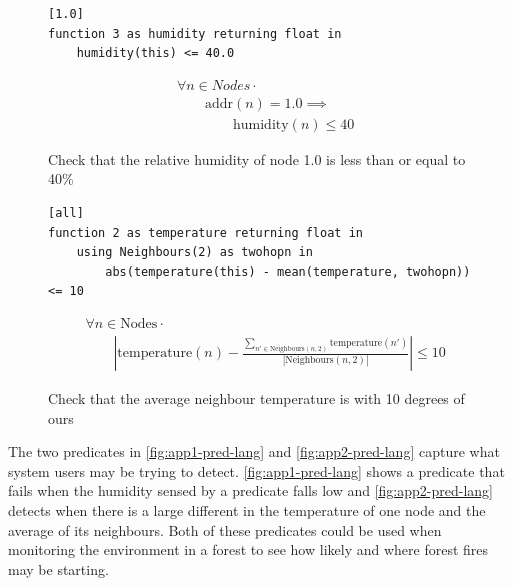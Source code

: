 \begin{figure}[H]
\begin{minipage}{.5\linewidth}
\begin{lstlisting}[language=Hoppy]
[1.0]
function 3 as humidity returning float in
    humidity(this) <= 40.0
\end{lstlisting}
\end{minipage}%
\begin{minipage}{.5\linewidth}
\begin{align*}
&				\forall n \in Nodes \cdot \\
& \hspace{2em}		\text{addr}(n) = 1.0 \implies \\
& \hspace{4em}			\text{humidity}(n) \leq 40
\end{align*}
\end{minipage}
\caption{Check that the relative humidity of node 1.0 is less than or equal to 40\%}
\label{fig:app1-pred-lang}
\end{figure}

\begin{figure}[H]
\begin{minipage}{.5\linewidth}
\begin{lstlisting}[language=Hoppy]
[all]
function 2 as temperature returning float in
    using Neighbours(2) as twohopn in
        abs(temperature(this) - mean(temperature, twohopn)) <= 10
\end{lstlisting}
\end{minipage}

\begin{minipage}{.5\linewidth}
\begin{align*}
&				\forall n \in \text{Nodes} \cdot \\
& \hspace{2em}		\left|\text{temperature}(n) - \frac{\sum\limits_{n' \in \text{Neighbours}(n, 2)} \text{temperature}(n')}{|\text{Neighbours}(n, 2)|} \right| \leq 10
\end{align*}
\end{minipage}
\caption{Check that the average neighbour temperature is with 10 degrees of ours}
\label{fig:app2-pred-lang}
\end{figure}

The two predicates in \autoref{fig:app1-pred-lang} and \autoref{fig:app2-pred-lang} capture what system users may be trying to detect. \autoref{fig:app1-pred-lang} shows a predicate that fails when the humidity sensed by a predicate falls low and \autoref{fig:app2-pred-lang} detects when there is a large different in the temperature of one node and the average of its neighbours. Both of these predicates could be used when monitoring the environment in a forest to see how likely and where forest fires may be starting. 


